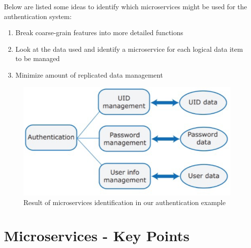 \begin{paracol}{2}
   
   Below are listed some ideas to identify which microservices might be used for the authentication system:
   \begin{enumerate}
      \item Break coarse-grain features into more detailed functions
      \item Look at the data used and identify a microservice for each logical data item to be managed
      \item Minimize amount of replicated data management
   \end{enumerate}

   \switchcolumn
   \vspace{\fill}
   \begin{figure}[htbp]
      \centering
      \includegraphics{images/microservices_auth.png}
      \caption{Result of microservices identification in our authentication example}
      \label{fig:microservices_auth}
   \end{figure}   
   \vspace{\fill}
\end{paracol}

\section{Microservices - Key Points}

